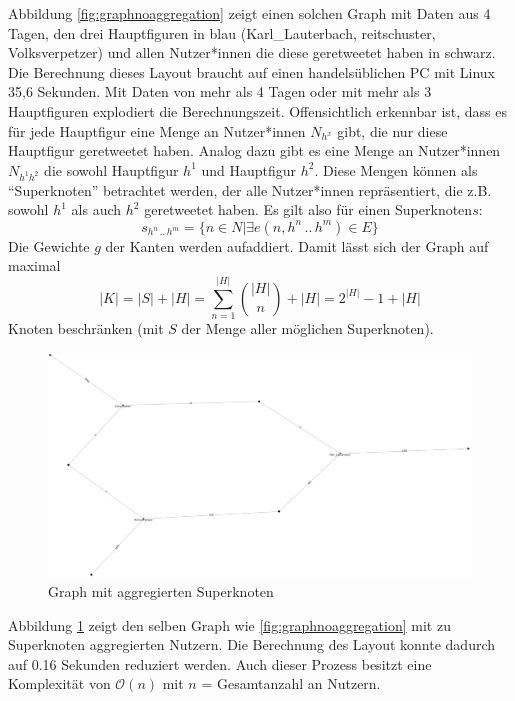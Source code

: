 Abbildung \ref{fig:graphnoaggregation} zeigt einen solchen Graph mit Daten aus 4 Tagen, den drei Hauptfiguren in blau (Karl\_Lauterbach, reitschuster, Volksverpetzer) und allen Nutzer*innen die diese \gls{geretweetet} haben in schwarz. Die Berechnung dieses Layout braucht auf einen handelsüblichen PC mit Linux 35,6 Sekunden. 
Mit Daten von mehr als 4 Tagen oder mit mehr als 3 Hauptfiguren explodiert die Berechnungszeit. 
Offensichtlich erkennbar ist, dass es  für jede Hauptfigur eine Menge an Nutzer*innen $N_{h^x}$ gibt, die nur diese Hauptfigur \gls{geretweetet} haben.
Analog dazu gibt es eine Menge an Nutzer*innen $N_{h^1h^2}$ die sowohl Hauptfigur $h^1$ und Hauptfigur $h^2$. 
Diese Mengen können als "`Superknoten"' betrachtet werden, der alle Nutzer*innen repräsentiert, die z.B. sowohl $h^1$ als auch $h^2$ \gls{geretweetet} haben.
Es gilt also für einen Superknoten$s$:
 \begin{equation}
s_{h^n\,..\,h^m} = \{n\in N|\exists e(n,h^n\,..\,h^m)\in E\}
\end{equation}
Die Gewichte $g$ der Kanten werden aufaddiert. 
Damit lässt sich der Graph auf maximal
\begin{equation}
|K| = |S| + |H| = \sum_{n=1}^{|H|} \binom{|H|}{n} + |H| = 2^{|H|} - 1 + |H|
\end{equation}
Knoten beschränken (mit $S$ der Menge aller möglichen Superknoten).
\begin{figure}[h]
	\centering
	\includegraphics[width=0.7\linewidth]{images/GraphNoThreshold}
	\caption{Graph mit aggregierten Superknoten}
	\label{fig:graphnothreshold}
\end{figure}
Abbildung \ref{fig:graphnothreshold} zeigt den selben Graph wie \ref{fig:graphnoaggregation} mit zu Superknoten aggregierten Nutzern.
Die Berechnung des Layout konnte dadurch auf 0.16 Sekunden reduziert werden.
Auch dieser Prozess besitzt eine Komplexität von $\mathcal{O}(n)$ mit $n$ = Gesamtanzahl an Nutzern. 
